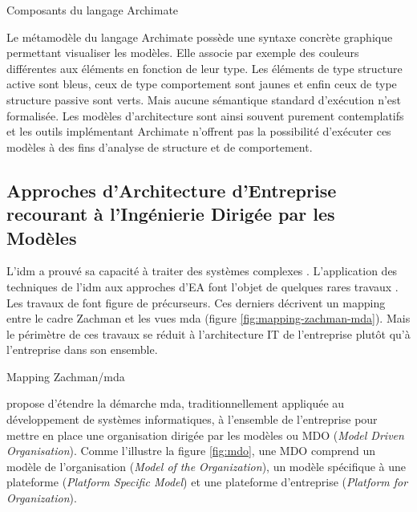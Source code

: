 \begin{table}[!ht]
    \vspace*{0.5em}
    \begin{center}
        
    \end{center}
 \caption{Composants du langage Archimate}
 \label{fig:archimate}
\end{table}

Le métamodèle du langage Archimate possède une syntaxe concrète graphique permettant visualiser les modèles. Elle associe par exemple des couleurs différentes aux éléments en fonction de leur type. Les éléments de type structure active sont bleus, ceux de type comportement sont jaunes et enfin ceux de type structure passive sont verts. Mais aucune sémantique standard d'exécution n'est formalisée. Les modèles d'architecture sont ainsi souvent purement contemplatifs et les outils implémentant Archimate n'offrent pas la possibilité d'exécuter ces modèles à des fins d'analyse de structure et de comportement. 

\subsection{Approches d'Architecture d'Entreprise \\
recourant à l'Ingénierie Dirigée par les Modèles}

L'\gls{idm} a prouvé sa capacité à traiter des systèmes complexes \cite{france2007model}. L'application des techniques de l'\gls{idm} aux approches d'EA font l'objet de quelques rares travaux \cite{bruneliere2013support}. Les travaux de \cite{frankel2003zachman} font figure de précurseurs. Ces derniers décrivent un mapping entre le cadre Zachman et les vues \gls{mda} (figure \ref{fig:mapping-zachman-mda}). Mais le périmètre de ces travaux se réduit à l'architecture IT de l'entreprise plutôt qu'à l'entreprise dans son ensemble.

\begin{table}[!ht]
    \vspace*{0.5em}
    \makebox[\linewidth][l]{%
      \hspace{3mm}%
    }
    \caption{Mapping Zachman/\gls{mda} \protect\cite{frankel2003zachman}}
    \label{fig:mapping-zachman-mda}
\end{table}

\cite{clark_towards_2014} propose d'étendre la démarche \gls{mda},  traditionnellement appliquée au développement de systèmes informatiques, à l'ensemble de l'entreprise pour mettre en place une organisation dirigée par les modèles ou MDO (\textit{Model Driven Organisation}). Comme l'illustre la figure \ref{fig:mdo}, une MDO comprend un modèle de l'organisation (\textit{Model of the Organization}), un modèle spécifique à une plateforme (\textit{Platform Specific Model}) et une plateforme d'entreprise (\textit{Platform for Organization}). 

